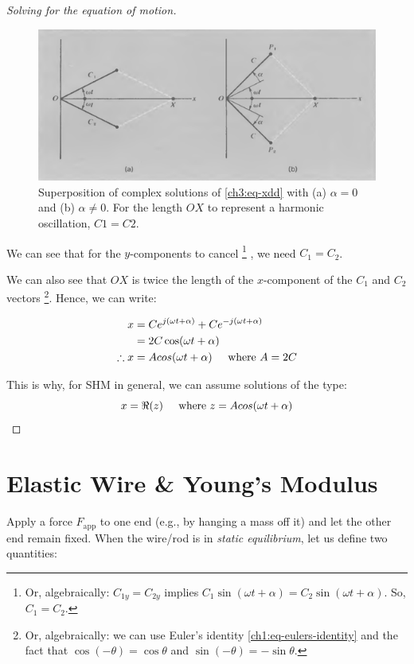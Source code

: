 \begin{proof}[Solving for the equation of motion]
\begin{figure}
	\centering
	\includegraphics[scale=0.5]{phys232/Ch3-adding-complex-solutions.png} \caption{Superposition of complex solutions of \eqref{ch3:eq-xdd} with (a) $\alpha=0$ and (b) $\alpha\neq 0$. For the length $OX$ to represent a harmonic oscillation, $C1=C2$.}
	\label{ch3:fig-complex-sols}
\end{figure}


We can see that for the $y$-components to cancel%
\footnote{Or, algebraically: $C_{1y} = C_{2y}$ implies $C_1\sin(\omega t+\alpha) = C_2\sin(\omega t+\alpha)$. So, $C_1 = C_2$.}%
, we need $C_1=C_2$.

We can also see that $OX$ is twice the length of the $x$-component of the $C_1$ and $C_2$ vectors%
\footnote{Or, algebraically: we can use Euler's identity \eqref{ch1:eq-eulers-identity} and the fact that $\cos(-\theta)=\cos\theta$ and $\sin(-\theta)=-\sin\theta$.}.
Hence, we can write:

\begin{align*}
x
&=Ce^{j(\omega t +\alpha)} + Ce^{-j(\omega t +\alpha)} \\
&= 2C\cos(\omega t + \alpha) \\
\therefore
x &= Acos(\omega t + \alpha) \hspace{0.5cm}\text{where } A=2C
\end{align*}

This is why, for SHM in general, we can assume solutions of the type:
\begin{equation}
	x=\Re(z) \hspace{0.5cm}\text{where } z=Acos(\omega t + \alpha)
\end{equation}
\end{proof}


\section{Elastic Wire \& Young's Modulus} \label{ch3:sec-wire}

Apply a force $F_\text{app}$ to one end (e.g., by hanging a mass off it) and let the other end remain fixed. When the wire/rod is in \textit{static equilibrium}, let us define two quantities:

